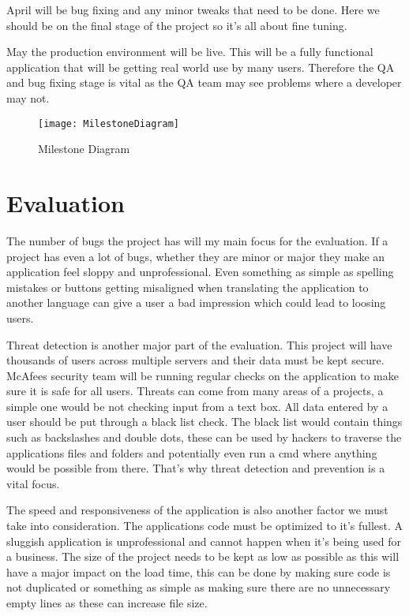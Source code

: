 April will be bug fixing and any minor tweaks that need to be done. Here we should be on the final stage of the project so it's all about fine tuning.

May the production environment will be live. This will be a fully functional application that will be getting real world use by many users. Therefore the QA and bug fixing stage is vital as the QA team may see problems where a developer may not.

\begin{figure}[ht]
  \centering
      \texttt{[image: MilestoneDiagram]}
  \caption[Milestone Diagram]{Milestone Diagram}
  \label{fig:milestoneD}
\end{figure}

\section{Evaluation}
The number of bugs the project has will my main focus for the evaluation. If a project has even a lot of bugs, whether they are minor or major they make an application feel sloppy and unprofessional. Even something as simple as spelling mistakes or buttons getting misaligned when translating the application to another language can give a user a bad impression which could lead to loosing users.

Threat detection is another major part of the evaluation. This project will have thousands of users across multiple servers and their data must be kept secure. McAfees security team will be running regular checks on the application to make sure it is safe for all users. Threats can come from many areas of a projects, a simple one would be not checking input from a text box. All data entered by a user should be put through a black list check. The black list would contain things such as backslashes and double dots, these can be used by hackers to traverse the applications files and folders and potentially even run a cmd where anything would be possible from there. That's why threat detection and prevention is a vital focus.

The speed and responsiveness of the application is also another factor we must take into consideration. The applications code must be optimized to it's fullest. A sluggish application is unprofessional and cannot happen when it's being used for a business. The size of the project needs to be kept as low as possible as this will have a major impact on the load time, this can be done by making sure code is not duplicated or something as simple as making sure there are no unnecessary empty lines as these can increase file size. 

